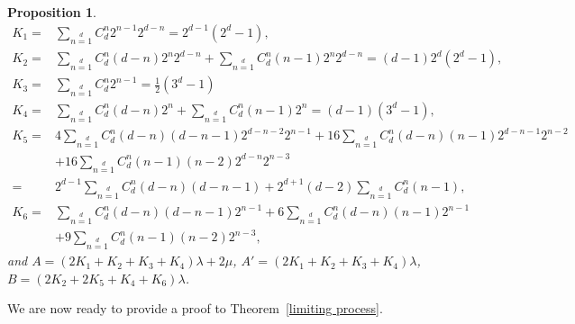 \documentclass[12pt]{article}
\newtheorem{proposition}{Proposition}[section]
\begin{document}
\begin{proposition}
\begin{align}
  K_1 =& \sum\limits_{n=1}\limits^{d}C_{d}^{n}2^{n-1}2^{d-n}=2^{d-1}(2^d-1),  \label{eqn:K1} \\
  K_2 =& \sum\limits_{n=1}\limits^{d}C_{d}^{n}(d-n)2^{n}2^{d-n}+\sum\limits_{n=1}\limits^{d}C_{d}^{n}(n-1)2^{n}2^{d-n}=(d-1)2^{d}(2^d-1),\\
  K_3 =& \sum\limits_{n=1}\limits^{d}C_{d}^{n}2^{n-1}=\frac{1}{2}(3^d-1)\\
  K_4 =& \sum\limits_{n=1}\limits^{d}C_{d}^{n}(d-n)2^{n}+\sum\limits_{n=1}\limits^{d}C_{d}^{n}(n-1)2^{n}=(d-1)(3^d-1),\\
  K_5 =& 4\sum\limits_{n=1}\limits^{d}C_{d}^{n}(d-n)(d-n-1)2^{d-n-2}2^{n-1}+16\sum\limits_{n=1}\limits^{d}C_{d}^{n}(d-n)(n-1)2^{d-n-1}
  2^{n-2} \nonumber \\
   & + 16\sum\limits_{n=1}\limits^{d}C_{d}^{n}(n-1)(n-2)2^{d-n}2^{n-3} \nonumber \\
  =& 2^{d-1}\sum\limits_{n=1}\limits^{d}C_{d}^{n}(d-n)(d-n-1)+2^{d+1}(d-2)\sum\limits_{n=1}\limits^{d}C_{d}^{n}(n-1),\\
  K_6=& \sum\limits_{n=1}\limits^{d}C_{d}^{n}(d-n)(d-n-1)2^{n-1}+6\sum\limits_{n=1}\limits^{d}C_{d}^{n}(d-n)(n-1)2^{n-1} \nonumber \\
      &+9\sum\limits_{n=1}\limits^{d}C_{d}^{n}(n-1)(n-2)2^{n-3}, \label{eqn:K6}
\end{align}
and $A=(2K_1+K_2+K_3+K_4)\lambda+2\mu$, $A'=(2K_1+K_2+K_3+K_4)\lambda$, $B=(2K_2+2K_5+K_4+K_6)\lambda$.
\end{proposition}


We are now ready to provide a proof to Theorem~\ref{limiting process}.
\end{document}
